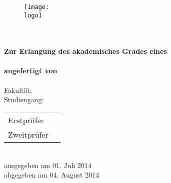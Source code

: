 \begin{titlepage}

	\phantom{tmpText}

	\vspace{1cm}

	\begin{figure}[h!]
		\centering
		\texttt{[image: \\logo]}
	\end{figure}

	\begin{center}

		\vspace{1cm}

		\textbf{{\large \art} \\[3ex]
		{\LARGE \titel} \\[8ex]
		Zur Erlangung des akademisches Grades eines \\
		\ziel \\[2ex]
		\vfill
		angefertigt von \\
		\autor} \\[2ex]
		\vfill
		Fakultät: \fakultaet \\
		Studiengang: \studiengang \\[2ex]
		\vfill
		\begin{tabular}{ll}
			Erstprüfer & \erstgutachter\\
			Zweitprüfer & \zweitgutachter
		\end{tabular} \\[2ex]
		\vfill
		ausgegeben am 01. Juli 2014 \\
		abgegeben am 04. August 2014
	\end{center}
\end{titlepage}
